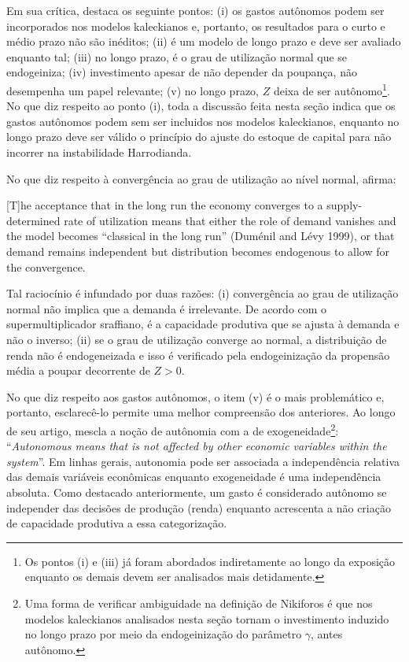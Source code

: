 
Em sua crítica, \textcite{nikiforos_comments_2018} destaca os seguinte pontos: 
(i) os gastos autônomos podem ser incorporados nos modelos kaleckianos e, portanto, os resultados para o curto e médio prazo não são inéditos; 
(ii) é um modelo de longo prazo e deve ser avaliado enquanto tal; 
(iii) no longo prazo, é o grau de utilização normal que se endogeiniza; 
(iv) investimento apesar de não depender da poupança, não desempenha um papel relevante; 
(v) no longo prazo, $Z$ deixa de ser autônomo\footnote{Os pontos (i) e (iii) já foram abordados indiretamente ao longo da exposição enquanto os demais devem ser analisados mais detidamente.}.  No que diz respeito ao ponto (i), toda a discussão feita nesta seção indica que os gastos autônomos podem sem ser incluidos nos modelos kaleckianos, enquanto no longo prazo deve ser válido o princípio do ajuste do estoque de capital para não incorrer na instabilidade Harrodianda. 

No que diz respeito à convergência ao grau de utilização ao nível normal, \citeauthor*{nikiforos_comments_2018} afirma:

\begin{citacao}

[T]he acceptance that in the long run the economy converges to a supply-determined rate of utilization means that either the role of demand vanishes and the model becomes ``classical in the long run'' (Duménil and Lévy 1999), or that demand remains independent but distribution becomes endogenous to allow for the convergence. \cite[p.~9]{nikiforos_comments_2018}
\end{citacao}
Tal raciocínio é infundado por duas razões: (i) convergência ao grau de utilização normal não implica que a demanda é irrelevante. De acordo com o supermultiplicador sraffiano, é a capacidade produtiva que se ajusta à demanda e não o inverso; (ii) se o grau de utilização converge ao normal, a distribuição de renda não é endogeneizada e isso é verificado pela endogeinização da propensão média a poupar decorrente de $Z>0$.

No que diz respeito aos gastos autônomos, o item (v) é o mais problemático e, portanto, esclarecê-lo permite uma melhor compreensão dos anteriores. Ao longo de seu artigo, \textcite[p.~4]{nikiforos_comments_2018} mescla a noção de autônomia com a de exogeneidade\footnote{Uma forma de verificar ambiguidade na definição de Nikiforos é que nos modelos kaleckianos analisados nesta seção tornam o investimento induzido no longo prazo por meio da endogeinização do parâmetro $\gamma$, antes autônomo. }: ``\textit{Autonomous means that is not affected by other economic variables within the system}''. Em linhas gerais, autonomia pode ser associada a independência relativa das demais variáveis econômicas enquanto exogeneidade é uma independência absoluta. Como destacado anteriormente, um gasto é considerado autônomo se independer das decisões de produção (renda) enquanto \textcite{serrano_sraffian_1995} acrescenta a não criação de capacidade produtiva a essa categorização. 


